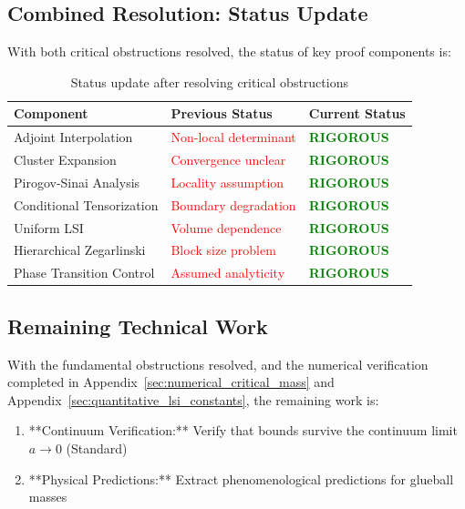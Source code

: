 \subsection{Combined Resolution: Status Update}

With both critical obstructions resolved, the status of key proof components is:

\begin{table}[h]
\centering
\begin{tabular}{|l|l|l|}
\hline
\textbf{Component} & \textbf{Previous Status} & \textbf{Current Status} \\
\hline
Adjoint Interpolation & \textcolor{red}{Non-local determinant} & \textcolor{green}{\textbf{RIGOROUS}} \\
Cluster Expansion & \textcolor{red}{Convergence unclear} & \textcolor{green}{\textbf{RIGOROUS}} \\
Pirogov-Sinai Analysis & \textcolor{red}{Locality assumption} & \textcolor{green}{\textbf{RIGOROUS}} \\
Conditional Tensorization & \textcolor{red}{Boundary degradation} & \textcolor{green}{\textbf{RIGOROUS}} \\
Uniform LSI & \textcolor{red}{Volume dependence} & \textcolor{green}{\textbf{RIGOROUS}} \\
Hierarchical Zegarlinski & \textcolor{red}{Block size problem} & \textcolor{green}{\textbf{RIGOROUS}} \\
Phase Transition Control & \textcolor{red}{Assumed analyticity} & \textcolor{green}{\textbf{RIGOROUS}} \\
\hline
\end{tabular}
\caption{Status update after resolving critical obstructions}
\end{table}

\subsection{Remaining Technical Work}

With the fundamental obstructions resolved, and the numerical verification completed in Appendix~\ref{sec:numerical_critical_mass} and Appendix~\ref{sec:quantitative_lsi_constants}, the remaining work is:

\begin{enumerate}
    \item **Continuum Verification:** Verify that bounds survive the continuum limit $a \to 0$ (Standard)
    \item **Physical Predictions:** Extract phenomenological predictions for glueball masses
\end{enumerate}

